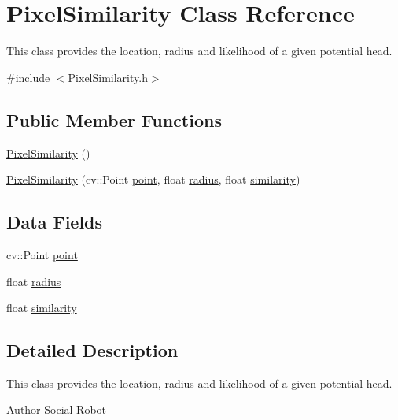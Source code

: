 \hypertarget{classPixelSimilarity}{
\section{PixelSimilarity Class Reference}
\label{classPixelSimilarity}
}


This class provides the location, radius and likelihood of a given potential head.  




{\ttfamily \#include $<$PixelSimilarity.h$>$}

\subsection*{Public Member Functions}
\begin{DoxyCompactItemize}
\item 
\hyperlink{classPixelSimilarity_a8d2c663a253dafb804765764e2dea32a}{PixelSimilarity} ()
\item 
\hyperlink{classPixelSimilarity_a0816faaaedb8d0e1ffe0aa40a438df4e}{PixelSimilarity} (cv::Point \hyperlink{classPixelSimilarity_a98e029104a5ee11b23554b02d7ac30e6}{point}, float \hyperlink{classPixelSimilarity_a4da3847fd0812a4c4fc415a20697acf4}{radius}, float \hyperlink{classPixelSimilarity_a4fa484885e6d7d38078c6d75e4f4d72e}{similarity})
\end{DoxyCompactItemize}
\subsection*{Data Fields}
\begin{DoxyCompactItemize}
\item 
cv::Point \hyperlink{classPixelSimilarity_a98e029104a5ee11b23554b02d7ac30e6}{point}
\item 
float \hyperlink{classPixelSimilarity_a4da3847fd0812a4c4fc415a20697acf4}{radius}
\item 
float \hyperlink{classPixelSimilarity_a4fa484885e6d7d38078c6d75e4f4d72e}{similarity}
\end{DoxyCompactItemize}


\subsection{Detailed Description}
This class provides the location, radius and likelihood of a given potential head. \begin{DoxyAuthor}{Author}
Social Robot 
\end{DoxyAuthor}


